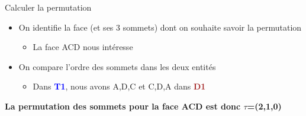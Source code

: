 \documentclass[9pt]{beamer}
\begin{document}
\begin{frame}
\begin{block}{Calculer la permutation}
\begin{itemize}
\item On identifie la face (et ses 3 sommets) dont on souhaite savoir la permutation
\begin{itemize}
\scriptsize
\item La face ACD nous intéresse
\end{itemize}
\item On compare l'ordre des sommets dans les deux entités
\begin{itemize}
\scriptsize
\item Dans \textcolor{blue}{\textbf{T1}}, nous avons A,D,C et C,D,A dans \textcolor{brown}{\textbf{D1}} 
\end{itemize}
\end{itemize}
\textbf{La permutation des sommets pour la face ACD est donc $\tau$=(2,1,0)}
\end{block}
\end{frame}
\end{document}
